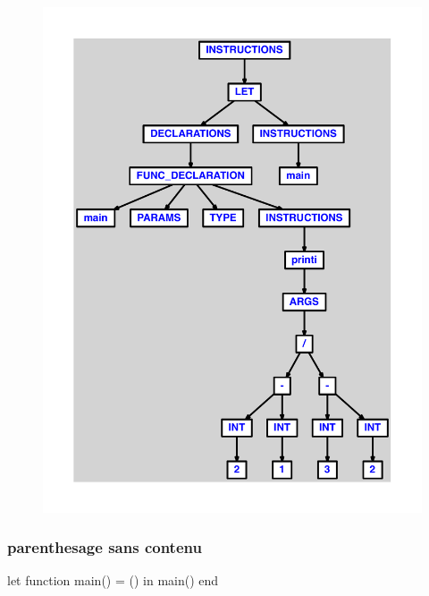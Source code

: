 \documentclass{article}
\begin{document}
\begin{figure}[H]\centering\includegraphics[max width=\textwidth]{ast/ast_32.pdf}\end{figure}\subsubsection{parenthesage sans contenu}
\begin{verbatimtab}
let function main() = () in main() end
\end{verbatimtab}
\end{document}
